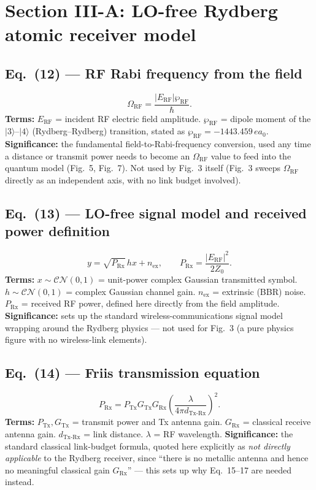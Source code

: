 \documentclass[11pt]{article}
\begin{document}
\section{Section III-A: LO-free Rydberg atomic receiver model}

\subsection*{Eq.~(12) --- RF Rabi frequency from the field}
\begin{equation}
\Omega_\text{RF} = \frac{|E_\text{RF}|\wp_\text{RF}}{\hbar}. \tag{12}
\end{equation}
\textbf{Terms:} $E_\text{RF}$ = incident RF electric field amplitude.
$\wp_\text{RF}$ = dipole moment of the $|3\rangle$--$|4\rangle$
(Rydberg--Rydberg) transition, stated as $\wp_\text{RF}=-1443.459\,ea_0$.
\textbf{Significance:} the fundamental field-to-Rabi-frequency
conversion, used any time a distance or transmit power needs to become
an $\Omega_\text{RF}$ value to feed into the quantum model (Fig.~5,
Fig.~7). Not used by Fig.~3 itself (Fig.~3 sweeps $\Omega_\text{RF}$
directly as an independent axis, with no link budget involved).

\subsection*{Eq.~(13) --- LO-free signal model and received power definition}
\begin{equation}
y = \sqrt{P_\text{Rx}}\,hx+n_\text{ex}, \qquad P_\text{Rx}=\frac{|E_\text{RF}|^2}{2Z_0}. \tag{13}
\end{equation}
\textbf{Terms:} $x\sim\mathcal{CN}(0,1)$ = unit-power complex Gaussian
transmitted symbol. $h\sim\mathcal{CN}(0,1)$ = complex Gaussian channel
gain. $n_\text{ex}$ = extrinsic (BBR) noise. $P_\text{Rx}$ = received RF
power, defined here directly from the field amplitude.
\textbf{Significance:} sets up the standard wireless-communications
signal model wrapping around the Rydberg physics --- not used for
Fig.~3 (a pure physics figure with no wireless-link elements).

\subsection*{Eq.~(14) --- Friis transmission equation}
\begin{equation}
P_\text{Rx} = P_\text{Tx}G_\text{Tx}G_\text{Rx}\left(\frac{\lambda}{4\pi d_\text{Tx-Rx}}\right)^2. \tag{14}
\end{equation}
\textbf{Terms:} $P_\text{Tx},G_\text{Tx}$ = transmit power and Tx
antenna gain. $G_\text{Rx}$ = classical receive antenna gain.
$d_\text{Tx-Rx}$ = link distance. $\lambda$ = RF wavelength.
\textbf{Significance:} the standard classical link-budget formula,
quoted here explicitly as \emph{not directly applicable} to the Rydberg
receiver, since ``there is no metallic antenna and hence no meaningful
classical gain $G_\text{Rx}$'' --- this sets up why Eq.~15--17 are needed
instead.
\end{document}
